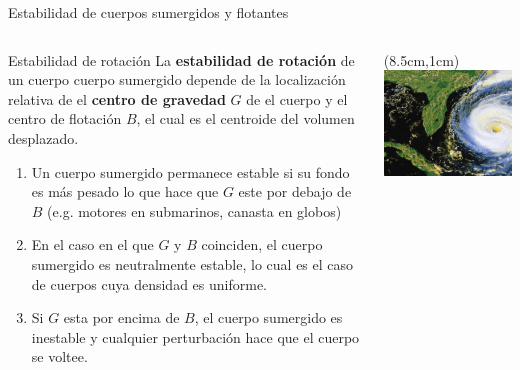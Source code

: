 \documentclass [xcolor=svgnames, t] {beamer}
\begin{document}
\begin{frame}{Estabilidad de cuerpos sumergidos y flotantes}
\small
\vspace{-0.8cm}
\begin{columns}
\begin{block}{Estabilidad de rotaci\'on}
La \textbf{estabilidad de rotaci\'on} de un cuerpo cuerpo sumergido depende de la localizaci\'on relativa de el \textbf{centro de gravedad} $G$ de el cuerpo y el centro de flotaci\'on $B$, el cual es el centroide del volumen desplazado. 
\begin{enumerate}
\item Un cuerpo sumergido permanece estable si su fondo es m\'as pesado lo que hace que $G$ este por debajo de $B$ (e.g. motores en submarinos, canasta en globos) 
\item En el caso en el que $G$ y $B$ coinciden, el cuerpo sumergido es neutralmente estable, lo cual es el caso de cuerpos cuya densidad es uniforme.
\item Si $G$ esta por encima de $B$, el cuerpo sumergido es inestable y cualquier perturbaci\'on hace que el cuerpo se voltee. 
\end{enumerate}
\end{block}
\begin{textblock*}{4cm}(8.5cm,1cm) %
\includegraphics[width=\textwidth]{rota}
\end{textblock*}
\end{columns}
\end{frame}
\end{document}
